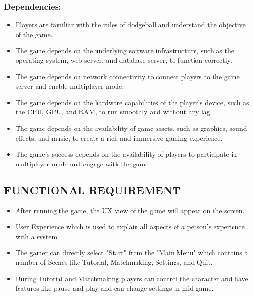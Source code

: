 \documentclass[12pt]{report}
\begin{document}
\hspace{1.7cm}\subsubsection{Dependencies:}
\begin{itemize}\item Players are familiar with the rules of dodgeball and understand the objective of the game.
\item The game depends on the underlying software infrastructure, such as the operating system, web server, and database server, to function correctly.
\item The game depends on network connectivity to connect players to the game server and enable multiplayer mode.
\item The game depends on the hardware capabilities of the player's device, such as the CPU, GPU, and RAM, to run smoothly and without any lag.
\item The game depends on the availability of game assets, such as graphics, sound effects, and music, to create a rich and immersive gaming experience.
\item The game's success depends on the availability of players to participate in multiplayer mode and engage with the game.
\end{itemize}


\centering
\raggedright
\subsection{ FUNCTIONAL REQUIREMENT}

\justifying
\setlength{\parindent}{4em}
\setlength{\parskip}{0.5em}
\renewcommand{\baselinestretch}{1.5}

\begin{itemize}\item After running the game, the UX view of the game will appear on the screen.
\item User Experience which is used to explain all aspects of a person's experience with a system.
\item The gamer can directly select "Start" from the "Main Menu"  which contains a number of Scenes like Tutorial, Matchmaking, Settings, and Quit.
\item During Tutorial and Matchmaking players can control the character and have features like pause and play and can change settings in mid-game.

\end{itemize}
\centering
\raggedright
\end{document}
